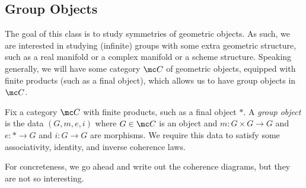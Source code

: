 \documentclass[../notes.tex]{subfiles}
\begin{document}
\subsection{Group Objects}
The goal of this class is to study symmetries of geometric objects. As such, we are interested in studying (infinite) groups with some extra geometric structure, such as a real manifold or a complex manifold or a scheme structure. Speaking generally, we will have some category $\mc C$ of geometric objects, equipped with finite products (such as a final object), which allows us to have group objects in $\mc C$.
\begin{definition}
	Fix a category $\mc C$ with finite products, such as a final object $*$. A \textit{group object} is the data $(G,m,e,i)$ where $G\in\mc C$ is an object and $m\colon G\times G\to G$ and $e\colon *\to G$ and $i\colon G\to G$ are morphisms. We require this data to satisfy some associativity, identity, and inverse coherence laws.
\end{definition}
For concreteness, we go ahead and write out the coherence diagrams, but they are not so interesting.
\end{document}
